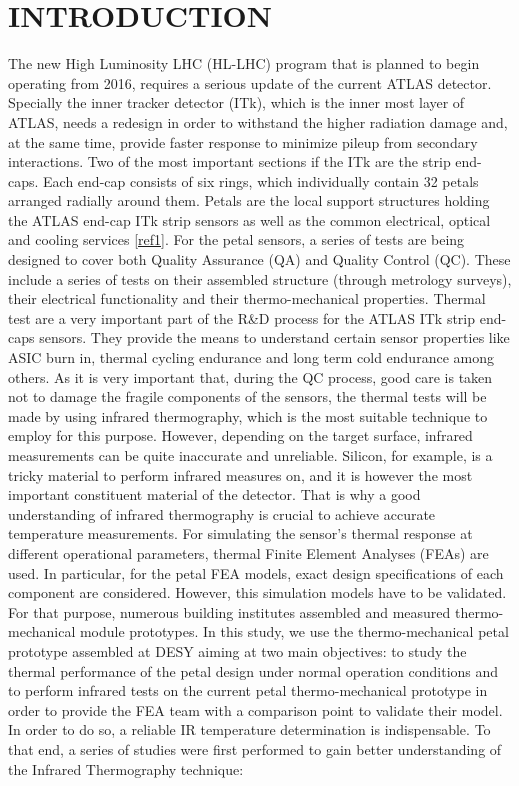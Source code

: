 \pagestyle{introduction}

\section*{\uppercase{Introduction}}\label{intro}
	\bigskip
	\bigskip
	The new High Luminosity LHC (HL-LHC) program that is planned to begin operating from 2016, requires a serious update of the current ATLAS detector. Specially the inner tracker detector (ITk), which is the inner most layer of ATLAS, needs a redesign in order to withstand the higher radiation damage and, at the same time, provide faster response to minimize pileup from secondary interactions.
	Two of the most important sections if the ITk are the strip end-caps. Each end-cap consists of six rings, which individually contain 32 petals arranged radially around them. Petals are the local support structures holding the ATLAS end-cap ITk strip sensors as well as the common electrical, optical and cooling services \ref{ref1}. For the petal sensors, a series of tests are being designed to cover both Quality Assurance (QA) and Quality Control (QC). These include a series of tests on their assembled structure (through metrology surveys), their electrical functionality and their thermo-mechanical properties.
	Thermal test are a very important part of the R\&D process for the ATLAS ITk strip end-caps sensors. They provide the means to understand certain sensor properties like ASIC burn in, thermal cycling endurance and long term cold endurance among others.
	As it is very important that, during the QC process, good care is taken not to damage the fragile components of the sensors, the thermal tests will be made by using infrared thermography, which is the most suitable technique to employ for this purpose. However, depending on the target surface, infrared measurements can be quite inaccurate and unreliable. Silicon, for example, is a tricky material to perform infrared measures on, and it is however the most important constituent material of the detector. That is why a good understanding of infrared thermography is crucial to achieve accurate temperature measurements.
	For simulating the sensor's thermal response at different operational parameters, thermal Finite Element Analyses (FEAs) are used. In particular, for the petal FEA models, exact design specifications of each component are considered. However, this simulation models have to be validated. For that purpose, numerous building institutes assembled and measured thermo-mechanical module prototypes.
	In this study, we use the thermo-mechanical petal prototype assembled at DESY aiming at two main objectives: to study the thermal performance of the petal design under	normal operation conditions and to perform infrared tests on the current petal thermo-mechanical prototype in order to provide the FEA team with a comparison point to validate their model. In order to do so, a reliable IR temperature determination is indispensable. To that end, a series of studies were first performed to gain better understanding of the Infrared Thermography technique:
		
